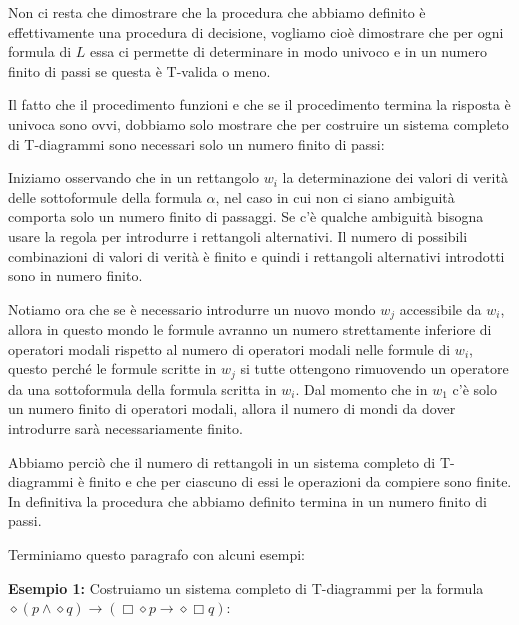 \documentclass[a4paper, titlepage, 12pt]{report}
\begin{document}
Non ci resta che dimostrare che la procedura che abbiamo definito è effettivamente
una procedura di decisione, vogliamo cioè dimostrare che per ogni formula di $L$
essa ci permette di determinare in modo univoco e in un numero finito di passi
se questa è T-valida o meno.

Il fatto che il procedimento funzioni e che se il procedimento termina la risposta è univoca
sono ovvi, dobbiamo solo mostrare che per costruire un sistema completo di T-diagrammi
sono necessari solo un numero finito di passi:

Iniziamo osservando che in un rettangolo $w_i$
la determinazione dei valori di verità delle sottoformule della formula $\alpha$,
nel caso in cui non ci siano ambiguità comporta solo un numero finito di passaggi.
Se c'è qualche ambiguità bisogna usare la regola per introdurre i rettangoli alternativi.
Il numero di possibili combinazioni di valori di verità è finito e quindi
i rettangoli alternativi introdotti sono in numero finito.

Notiamo ora che se è necessario introdurre un nuovo mondo $w_j$ accessibile da $w_i$,
allora in questo mondo le formule avranno un numero strettamente inferiore di operatori
modali rispetto al numero di operatori modali nelle formule di $w_i$, questo perché
le formule scritte in $w_j$ si tutte ottengono rimuovendo un operatore da una sottoformula
della formula scritta in $w_i$.
Dal momento che in $w_1$ c'è solo un numero finito di operatori
modali, allora il numero di mondi da dover introdurre sarà necessariamente finito.

Abbiamo perciò che il numero di rettangoli in un sistema completo di T-diagrammi è finito
e che per ciascuno di essi le operazioni da compiere sono finite. In definitiva
la procedura che abbiamo definito termina in un numero finito di passi.

Terminiamo questo paragrafo con alcuni esempi:

\pagebreak

\textbf{Esempio 1:}
Costruiamo un sistema completo di T-diagrammi per la formula
$\diamond (p \land \diamond q) \rightarrow (\Box \diamond p \rightarrow \diamond \Box q)$:
\end{document}
